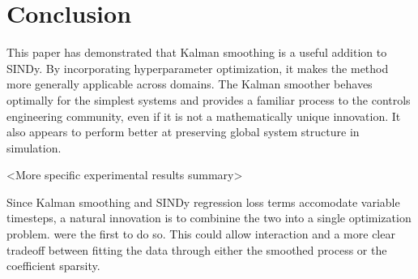 \documentclass{article}
\begin{document}
\section{Conclusion}
This paper has demonstrated that Kalman smoothing is a useful addition to SINDy.  By incorporating hyperparameter optimization, it makes the method more generally applicable across domains. The Kalman smoother behaves optimally for the simplest systems and provides a familiar process to the controls engineering community, even if it is not a mathematically unique innovation.  It also appears to perform better at preserving global system structure in simulation.

<More specific experimental results summary>

Since Kalman smoothing and SINDy regression loss terms accomodate variable timesteps, a natural innovation is to combinine the two into a single optimization problem.  \cite{Hirsh2022} were the first to do so.  This could allow interaction and a more clear tradeoff between fitting the data through either the smoothed process or the coefficient sparsity.
\end{document}
